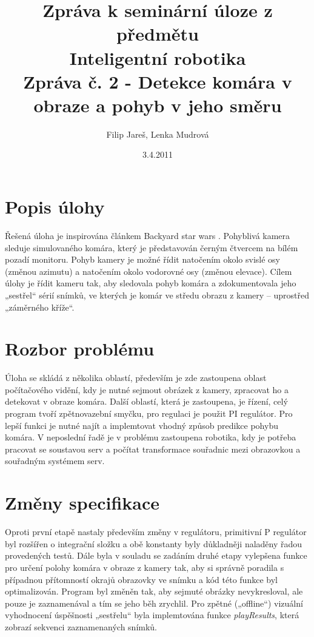 \documentclass[a4paper,10pt]{article}
\title{Zpráva k seminární úloze z předmětu\\ Inteligentní robotika \\ {\small Zpráva č. 2 - Detekce komára v obraze a pohyb v jeho směru}}
\author{Filip Jareš, Lenka Mudrová}
\date{3.4.2011}
\begin{document}
\maketitle
\newpage


\section{Popis úlohy}

		Řešená úloha je inspirována článkem Backyard star wars \cite{zadani}. Pohyblivá
		kamera sleduje simulovaného komára, který je představován černým čtvercem na
		bílém pozadí monitoru. Pohyb kamery je možné řídit natočením okolo svislé osy
		(změnou azimutu) a natočením okolo vodorovné osy (změnou elevace). Cílem úlohy
		je řídit kameru tak, aby sledovala pohyb komára a zdokumentovala jeho „sestřel“
		sérií snímků, ve kterých je komár ve středu obrazu z kamery – uprostřed
		„záměrného kříže“.

\section{Rozbor problému}

		Úloha se skládá z několika oblastí, především je zde zastoupena oblast
		počítačového vidění, kdy je nutné sejmout obrázek z kamery, zpracovat ho a
		detekovat v obraze komára. Další oblastí, která je zastoupena, je řízení, celý
		program tvoří zpětnovazební smyčku, pro regulaci je použit PI regulátor. Pro
		lepší funkci je nutné najít a implemtovat vhodný způsob predikce pohybu komára.
		V neposlední řadě je v problému zastoupena robotika, kdy je potřeba pracovat se
		soustavou serv a počítat transformace souřadnic mezi obrazovkou a souřadným
		systémem serv.

\section{Změny specifikace}


		Oproti první etapě nastaly především změny v regulátoru, primitivní P regulátor
		byl rozšířen o integrační složku a obě konstanty byly důkladněji naladěny řadou
		provedených testů. Dále byla v souladu se zadáním druhé etapy vylepšena funkce
		pro určení polohy komára v obraze z kamery tak, aby si správně poradila s případnou
		přítomností okrajů obrazovky ve snímku a kód této funkce byl optimalizován.
		Program byl změněn tak, aby sejmuté obrázky nevykresloval,
		ale pouze je zaznamenával a tím se jeho běh zrychlil. Pro zpětné („offline“) vizuální 
		vyhodnocení úspěšnosti „sestřelu“ byla implemtována funkce \textit{playResults},
		která zobrazí sekvenci zaznamenaných snímků.
\end{document}
